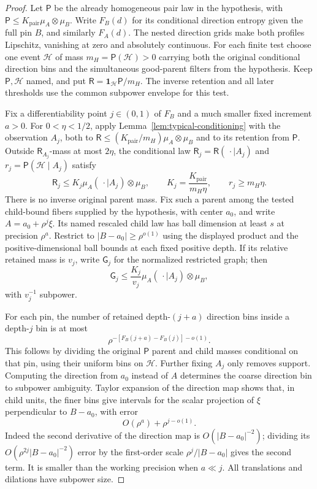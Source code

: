\begin{proof}
Let $\mathsf P$ be the already homogeneous pair law in the hypothesis,
with $\mathsf P\le K_{\mathrm{pair}}\mu_A\otimes\mu_B$.
Write $F_B(d)$ for its conditional direction entropy given the full
pin $B$, and similarly $F_A(d)$.  The nested direction grids make both
profiles Lipschitz, vanishing at zero and absolutely continuous.
For each finite test choose one event $\mathcal H$ of mass
$m_H=\mathsf P(\mathcal H)>0$ carrying both the original conditional
direction bins and the simultaneous good-parent filters from the
hypothesis.  Keep
$\mathsf P,\mathcal H$ named, and put
$\mathsf R=\boldsymbol1_{\mathcal H}\mathsf P/m_H$.
The inverse retention and all later thresholds use the common
subpower envelope for this test.

Fix a differentiability point $j\in(0,1)$ of $F_B$ and a much smaller
fixed increment $a>0$.  For $0<\eta<1/2$, apply
Lemma~\ref{lem:typical-conditioning} with the observation $A_j$, both
to $\mathsf R\le(K_{\mathrm{pair}}/m_H)\mu_A\otimes\mu_B$ and to its
retention from $\mathsf P$.  Outside $\mathsf R_{A_j}$-mass at most
$2\eta$, the conditional law $\mathsf R_j=\mathsf R(\,\cdot\mid A_j)$
and $r_j=\mathsf P(\mathcal H\mid A_j)$ satisfy
\[
 \mathsf R_j\le K_j\mu_A(\,\cdot\mid A_j)\otimes\mu_B,
 \qquad K_j=\frac{K_{\mathrm{pair}}}{m_H\eta},\qquad r_j\ge m_H\eta.
\]
There is no inverse original parent mass.  Fix such a parent among the
tested child-bound fibers supplied by the hypothesis, with center
$a_0$, and write $A=a_0+\rho^j\xi$.  Its named rescaled child law has
ball dimension at least $s$ at precision $\rho^a$.  Restrict to
$|B-a_0|\ge\rho^{o(1)}$ using the displayed product and the
positive-dimensional ball bounds at each fixed positive depth.
If its relative retained mass is $v_j$, write $\mathsf G_j$ for the
normalized restricted graph; then
\[
 \mathsf G_j\le\frac{K_j}{v_j}\mu_A(\,\cdot\mid A_j)\otimes\mu_B,
\]
with $v_j^{-1}$ subpower.

For each pin, the number of retained depth-$(j+a)$ direction bins
inside a depth-$j$ bin is at most
\begin{equation}\label{eq:rate-direction-count}
 \rho^{-[F_B(j+a)-F_B(j)]-o(1)}.
\end{equation}
This follows by dividing the original $\mathsf P$ parent and child
masses conditional on that pin, using their uniform bins on
$\mathcal H$.  Further fixing $A_j$
only removes support. Computing the direction from $a_0$ instead of
$A$ determines the coarse direction bin to subpower ambiguity.
Taylor expansion of the direction map shows that, in child units,
the finer bins give intervals for the scalar projection of $\xi$
perpendicular to $B-a_0$, with error
\[
 O(\rho^a)+\rho^{j-o(1)}.
\]
Indeed the second derivative of the direction map is
$O(|B-a_0|^{-2})$; dividing its $O(\rho^{2j}|B-a_0|^{-2})$
error by the first-order scale $\rho^j/|B-a_0|$ gives the second
term. It is smaller than the working precision when $a\ll j$.
All translations and dilations have subpower size.


\end{proof}
